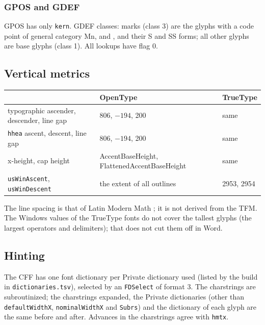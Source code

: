 \documentclass[10pt]{article}
\newcommand\file[1]{\texttt{#1}}
\newcommand\code[1]{\texttt{#1}}
\newcommand\feat[1]{\texttt{#1}}
\begin{document}
\subsubsection{GPOS and GDEF}

GPOS has only \feat{kern}.  GDEF classes: marks (class 3) are the
glyphs with a code point of general category Mn, \code{\string\wbar}
and \code{\string\wwbar}, and their S and SS forms; all other
glyphs are base glyphs (class 1).  All lookups have flag 0.

\subsection{Vertical metrics}\label{app:vmetrics}

\begin{center}
\begin{tabular}{lll}
\toprule
& OpenType & TrueType \\
\midrule
typographic ascender, descender, line gap & 806, $-194$, 200 & same \\
\code{hhea} ascent, descent, line gap & 806, $-194$, 200 & same \\
x-height, cap height & AccentBaseHeight, FlattenedAccentBaseHeight & same \\
\code{usWinAscent}, \code{usWinDescent} & the extent of all
  outlines & 2953, 2954 \\
\bottomrule
\end{tabular}
\end{center}

The line spacing is that of Latin Modern Math \cite{lm-math}; it is
not derived from the TFM.
The Windows values of the TrueType fonts do not cover the tallest
glyphs (the largest operators and delimiters); that does not cut them
off in Word.

\subsection{Hinting}\label{sec:hints}

The CFF has one font dictionary per Private dictionary used (listed by
the build in \file{dictionaries.tsv}), selected by an \code{FDSelect} of
format 3.  The charstrings are subroutinized; the charstrings expanded,
the Private dictionaries (other than \code{defaultWidthX},
\code{nominalWidthX} and \code{Subrs}) and the dictionary of each glyph
are the same before and after.  Advances in the charstrings agree with
\code{hmtx}.
\end{document}
